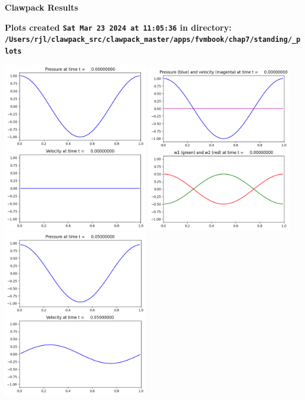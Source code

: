 \documentclass[11pt]{article}
\begin{document}
        \begin{center}{\Large\bf Clawpack Results}\vskip 5pt
        
        \bf Plots created {\tt Sat Mar 23 2024 at 11:05:36} in directory: \vskip 5pt
        \verb+/Users/rjl/clawpack_src/clawpack_master/apps/fvmbook/chap7/standing/_plots+
        \end{center}
        \vskip 5pt
        \includegraphics[width=0.475\textwidth]{frame0000fig1.png}
\includegraphics[width=0.475\textwidth]{frame0000fig2.png}
\vskip 10pt 
\includegraphics[width=0.475\textwidth]{frame0001fig1.png}
\end{document}
